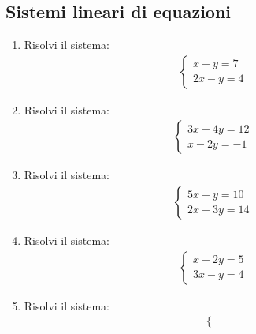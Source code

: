 \documentclass[letterpaper,10pt,italian]{jupyterBook}
\begin{document}
\subsection{Sistemi lineari di equazioni}
\label{\detokenize{ch/algebra/real-n-algebra:sistemi-lineari-di-equazioni}}\begin{enumerate}
%
\item {} 
\sphinxAtStartPar
Risolvi il sistema:
\begin{equation*}
\begin{split}
   \begin{cases}
   x + y = 7 \\
   2x - y = 4
   \end{cases}
   \end{split}
\end{equation*}
\item {} 
\sphinxAtStartPar
Risolvi il sistema:
\begin{equation*}
\begin{split}
   \begin{cases}
   3x + 4y = 12 \\
   x - 2y = -1
   \end{cases}
   \end{split}
\end{equation*}
\item {} 
\sphinxAtStartPar
Risolvi il sistema:
\begin{equation*}
\begin{split}
   \begin{cases}
   5x - y = 10 \\
   2x + 3y = 14
   \end{cases}
   \end{split}
\end{equation*}
\item {} 
\sphinxAtStartPar
Risolvi il sistema:
\begin{equation*}
\begin{split}
   \begin{cases}
   x + 2y = 5 \\
   3x - y = 4
   \end{cases}
   \end{split}
\end{equation*}
\item {} 
\sphinxAtStartPar
Risolvi il sistema:
\begin{equation*}
\begin{split}
   \begin{cases}

\end{cases}
\end{split}
\end{equation*}
\end{enumerate}
\end{document}
